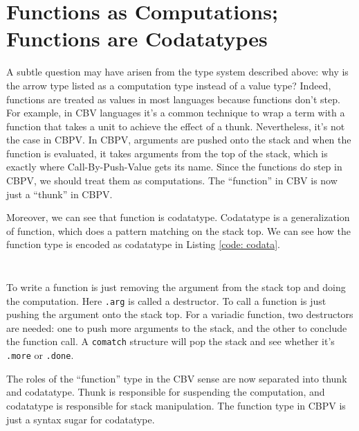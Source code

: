 \documentclass[acmsmall,nonacm]{acmart}
\begin{document}
\section{Functions as Computations; Functions are Codatatypes}

A subtle question may have arisen from the type system described above: why is the arrow type listed as a computation type instead of a value type? Indeed, functions are treated as values in most languages because functions don't step. For example, in CBV languages it's a common technique to wrap a term with a function that takes a unit to achieve the effect of a thunk. Nevertheless, it's not the case in CBPV. In CBPV, arguments are pushed onto the stack and when the function is evaluated, it takes arguments from the top of the stack, which is exactly where Call-By-Push-Value gets its name. Since the functions do step in CBPV, we should treat them as computations. The ``function'' in CBV  is now just a ``thunk'' in CBPV.

Moreover, we can see that function is codatatype. Codatatype is a generalization of function, which does a pattern matching on the stack top. We can see how the function type is encoded as codatatype in Listing \ref{code: codata}.

\begin{listing}[ht]
    \begin{multicols}{2}
        \inputminted{Haskell}{examples/fn_as_codata.zydeco}
        \vfill
        \inputminted{Haskell}{examples/fn_multi.zydeco}
        \vfill
    \end{multicols}
    \label{code: codata}
\end{listing}

To write a function is just removing the argument from the stack top and doing the computation. Here \texttt{.arg} is called a destructor. To call a function is just pushing the argument onto the stack top. For a variadic function, two destructors are needed: one to push more arguments to the stack, and the other to conclude the function call. A \texttt{comatch} structure will pop the stack and see whether it's \texttt{.more} or \texttt{.done}.

The roles of the ``function'' type in the CBV sense are now separated into thunk and codatatype. Thunk is responsible for suspending the computation, and codatatype is responsible for stack manipulation. The function type in CBPV is just a syntax sugar for codatatype.
\end{document}
